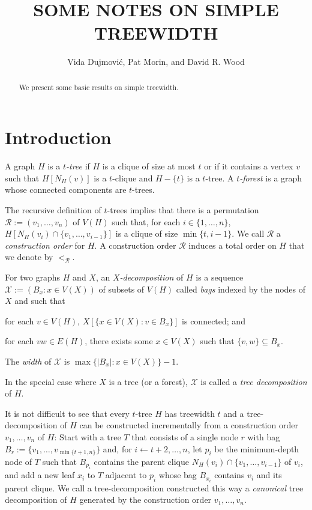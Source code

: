 \documentclass[kpfonts]{patmorin}
\title{\MakeUppercase{Some Notes on Simple Treewidth}}
\author{Vida Dujmović, Pat Morin, and David R. Wood}
\theoremstyle{named}
\begin{document}
\begin{titlepage}
\maketitle

\begin{abstract}
  We present some basic results on simple treewidth.
\end{abstract}
\end{titlepage}

\tableofcontents

\newpage
{}

\section{Introduction}

A graph $H$ is a \emph{$t$-tree} if $H$ is a clique of size at most $t$ or if it contains a vertex $v$ such that $H[N_H(v)]$ is a $t$-clique and $H-\{t\}$ is a $t$-tree.  A \emph{$t$-forest} is a graph whose connected components are $t$-trees.

The recursive definition of $t$-trees implies that there is a permutation $\mathcal{R}:=(v_1,\ldots,v_n)$ of $V(H)$ such that, for each $i\in\{1,\ldots,n\}$, $H[N_H(v_i)\cap \{v_1,\ldots,v_{i-1}\}]$ is a clique of size $\min\{t,i-1\}$.  We call $\mathcal{R}$ a \emph{construction order} for $H$.  A construction order $\mathcal{R}$ induces a total order on $H$ that we denote by $<_{\mathcal{R}}$.

For two graphs $H$ and $X$, an \emph{$X$-decomposition} of $H$ is a sequence $\mathcal{X}:=(B_x:x\in V(X))$ of subsets of $V(H)$ called \emph{bags} indexed by the nodes of $X$ and such that
 \begin{inparaenum}[(i)]
     \item for each $v\in V(H)$, $X[\{x\in V(X):v\in B_x\}]$ is connected; and
     \item for each $vw\in E(H)$, there exists some $x\in V(X)$ such that $\{v,w\}\subseteq B_x$.
\end{inparaenum}
The \emph{width} of $\mathcal{X}$ is $\max\{|B_x|:x\in V(X)\}-1$.

In the special case where $X$ is a tree (or a forest), $\mathcal{X}$ is called a \emph{tree decomposition} of $H$.

It is not difficult to see that every $t$-tree $H$ has treewidth $t$ and a tree-decomposition of $H$ can be constructed incrementally from a construction order $v_1,\ldots,v_n$ of $H$: Start with a tree $T$ that consists of a single node $r$ with bag $B_r:=\{v_1,\ldots,v_{\min\{t+1,n\}}\}$ and, for $i\gets t+2,\ldots,n$, let $p_i$ be the minimum-depth node of $T$ such that $B_{p_i}$ contains the parent clique $N_H(v_i)\cap\{v_1,\ldots,v_{i-1}\}$ of $v_i$, and add a new leaf $x_i$ to $T$ adjacent to $p_i$ whose bag $B_{x_i}$ contains $v_i$ and its parent clique.  We call a tree-decomposition constructed this way a \emph{canonical} tree decomposition of $H$ generated by the construction order $v_1,\ldots,v_n$.
\end{document}
